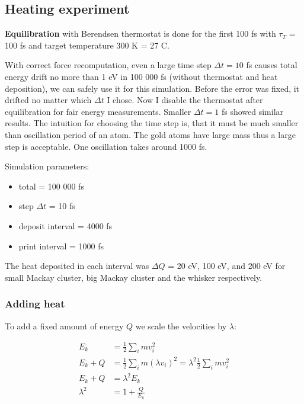 \documentclass[12pt,a4paper]{article}
\newcommand{\framed}[1]{\tikz[baseline=(char.base)]{\node[shape=rectangle,draw,inner sep=4pt] (char) {#1};}}
\begin{document}
\subsection*{Heating experiment}

{\bf Equilibration} with Berendsen thermostat is done for the first 100 fs with $\tau_T$ = 100 fs and target temperature 300 K = 27 C.

With correct force recomputation, even a large time step $\Delta t=10$ fs causes total energy drift no more than 1 eV in 100 000 fs (without thermostat and heat deposition), we can safely use it for this simulation. Before the error was fixed, it drifted no matter which $\Delta t$ I chose. Now I disable the thermostat after equilibration for fair energy measurements. Smaller $\Delta t = 1$ fs showed similar results. The intuition for choosing the time step is, that it must be much smaller than oscillation period of an atom. The gold atoms have large mass thus a large step is acceptable. One oscillation takes around 1000 fs.

Simulation parameters:
\begin{itemize}
	\item total = 100 000 fs
	\item step $\Delta t$ = 10 fs
	\item deposit interval = 4000 fs
	\item print interval = 1000 fs
\end{itemize}

The heat deposited in each interval was $\Delta Q$ = 20 eV, 100 eV, and 200 eV for small Mackay cluster, big Mackay cluster and the whisker respectively.

\subsubsection*{Adding heat}

To add a fixed amount of energy $Q$ we scale the velocities by $\lambda$:

\[
\begin{aligned}
	E_k &= \frac{1}{2} \sum_i m v_i^2 \\
	E_k + Q &= \frac{1}{2} \sum_i m (\lambda v_i)^2 = \lambda^2 \frac{1}{2} \sum_i m v_i^2 \\
	E_k + Q &= \lambda^2 E_k \\
	\lambda^2 &= 1 + \frac{Q}{E_k} \\
\end{aligned}
\]

{\centering\framed{ \( \lambda = \sqrt{1 + \frac{Q}{E_k}} \) }\\}
\end{document}
